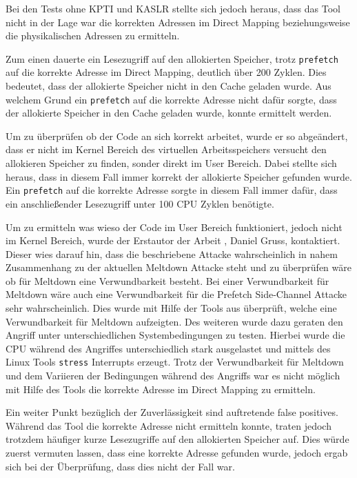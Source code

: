 Bei den Tests ohne KPTI und KASLR stellte sich jedoch heraus, dass das Tool nicht in der Lage war die korrekten Adressen im Direct Mapping beziehungsweise die physikalischen Adressen zu ermitteln.

Zum einen dauerte ein Lesezugriff auf den allokierten Speicher, trotz \texttt{prefetch} auf die korrekte Adresse im Direct Mapping, deutlich über 200 Zyklen. Dies bedeutet, dass der allokierte Speicher nicht in den Cache geladen wurde. Aus welchem Grund ein \texttt{prefetch} auf die korrekte Adresse nicht dafür sorgte, dass der allokierte Speicher in den Cache geladen wurde, konnte ermittelt werden.

Um zu überprüfen ob der Code an sich korrekt arbeitet, wurde er so abgeändert, dass er nicht im Kernel Bereich des virtuellen Arbeitsspeichers versucht den allokieren Speicher zu finden, sonder direkt im User Bereich. Dabei stellte sich heraus, dass in diesem Fall immer korrekt der allokierte Speicher gefunden wurde. Ein \texttt{prefetch} auf die korrekte Adresse sorgte in diesem Fall immer dafür, dass ein anschließender Lesezugriff unter 100 CPU Zyklen benötigte.

Um zu ermitteln was wieso der Code im User Bereich funktioniert, jedoch nicht im Kernel Bereich, wurde der Erstautor der Arbeit \cite{DBLP:journals/corr/abs-1710-00551}, Daniel Gruss, kontaktiert. Dieser wies darauf hin, dass die beschriebene Attacke wahrscheinlich in nahem Zusammenhang zu der aktuellen Meltdown Attacke steht und zu überprüfen wäre ob für Meltdown eine Verwundbarkeit besteht. Bei einer Verwundbarkeit für Meltdown wäre auch eine Verwundbarkeit für die Prefetch Side-Channel Attacke sehr wahrscheinlich. Dies wurde mit Hilfe der Tools aus \cite{git-meltdown} überprüft, welche eine Verwundbarkeit für Meltdown aufzeigten. Des weiteren wurde dazu geraten den Angriff unter unterschiedlichen Systembedingungen zu testen. Hierbei wurde die CPU während des Angriffes unterschiedlich stark ausgelastet und mittels des Linux Tools \texttt{stress} Interrupts erzeugt. Trotz der Verwundbarkeit für Meltdown und dem Variieren der Bedingungen während des Angriffs war es nicht möglich mit Hilfe des Tools die korrekte Adresse im Direct Mapping zu ermitteln.

Ein weiter Punkt bezüglich der Zuverlässigkeit sind auftretende false positives. Während das Tool die korrekte Adresse nicht ermitteln konnte, traten jedoch trotzdem häufiger kurze Lesezugriffe auf den allokierten Speicher auf. Dies würde zuerst vermuten lassen, dass eine korrekte Adresse gefunden wurde, jedoch ergab sich bei der Überprüfung, dass dies nicht der Fall war.


